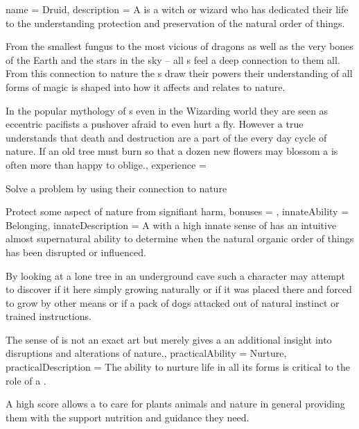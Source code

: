 \archetype
{
	name = Druid,
	description = A {\bname{}} is a witch or wizard who has dedicated their life to the understanding\comma{} protection and preservation of the natural order of things. 

From the smallest fungus\comma{} to the most vicious of dragons\comma{} as well as the very bones of the Earth\comma{} and the stars in the sky – all {\bname{}}s feel a deep connection to them all. From this connection to nature\comma{} the \bname{}s draw their powers their understanding of all forms of magic is shaped into how it affects and relates to nature.

In the popular mythology of \bname{}s\comma{} even in the Wizarding world\comma{} they are seen as eccentric pacifists\comma{} a pushover afraid to even hurt a fly. However\comma{} a true \bname{} understands that death and destruction are a part of the every day cycle of nature. If an old tree must burn so that a dozen new flowers may blossom\comma{} a  is often more than happy to oblige.,
	experience = \item Solve a problem by using their connection to nature
\item Protect some aspect of nature from signifiant harm,
	bonuses = 
,
	innateAbility = Belonging,
	innateDescription = A \bname{} with a high innate sense of  has an intuitive\comma{} almost supernatural ability to determine when the natural\comma{} organic\comma{} order of things has been disrupted or influenced.

By looking at a lone tree in an underground cave\comma{} such a character may attempt to discover if it  here\comma{} simply growing naturally\comma{} or if it was placed there and forced to grow by other means\comma{} or if a pack of dogs attacked out of natural instinct\comma{} or trained instructions. 

The sense of  is not an exact art\comma{} but merely gives a \bname{} an additional insight into disruptions and alterations of nature.,
	practicalAbility = Nurture,
	practicalDescription = The ability to nurture life\comma{} in all its forms\comma{} is critical to the role of a \bname{}. 

A high  score allows a \bname{} to care for plants\comma{} animals and nature in general\comma{} providing them with the support\comma{} nutrition and guidance they need.

}
